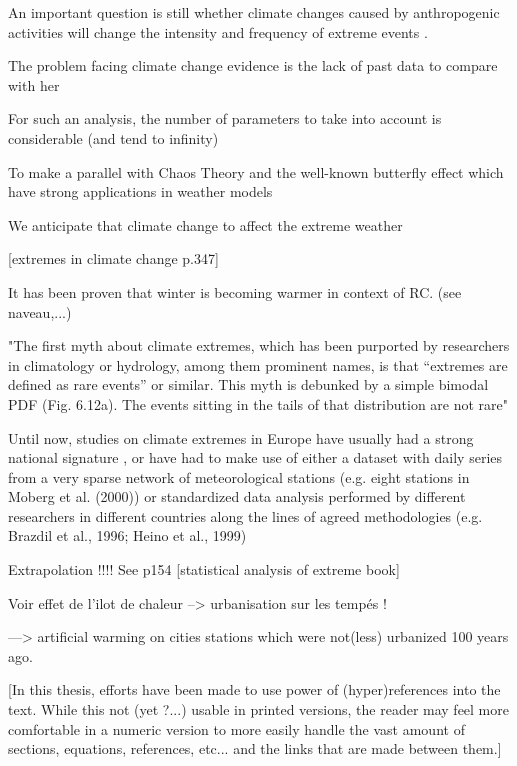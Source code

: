 \documentclass[11pt,a4paper,openany, twosided]{book}
\begin{document}
An important question is still whether climate changes caused by anthropogenic activities will change the intensity and frequency of extreme events \cite{milly_climate_2008}.

The problem facing climate change evidence is the lack of past data to compare with her

For such an analysis, the number of parameters to take into account is considerable (and tend to infinity)  

To make a parallel with Chaos Theory and the well-known butterfly effect which have strong applications in weather models\newline

We anticipate that climate change to affect the extreme weather  \newline

[extremes in climate change p.347]


It has been proven that winter is becoming warmer in context of RC. (see naveau,...)


\cite{kharin_changes_2006}


"The first myth about climate extremes, which has been purported by
researchers in climatology or hydrology, among them prominent names, is that
“extremes are defined as rare events” or similar. This myth is debunked by a simple
bimodal PDF (Fig. 6.12a). The events sitting in the tails of that distribution are not
rare" \cite[pp.257]{mudelsee_climate_2014}
\newline

Until now, studies on climate extremes in Europe have usually had a strong national signature
, or have had to make use of either a
dataset with daily series from a very sparse network of meteorological stations (e.g. eight stations in Moberg
et al. (2000)) or standardized data analysis performed by different researchers in different countries along the
lines of agreed methodologies (e.g. Brazdil et al., 1996; Heino et al., 1999) \cite{klein_tank_daily_2002}


Extrapolation !!!! See p154 [statistical analysis of extreme book]



Voir effet de l'ilot de chaleur --> urbanisation sur les tempés !

---> artificial warming on cities stations which were not(less) urbanized 100 years ago.

[In this thesis, efforts have been made to use power of (hyper)references into the 
text. While this not (yet ?...) usable in printed versions, the reader may feel more 
comfortable in a numeric version to more easily handle the vast amount of sections, 
equations, references, etc... and the links that are made between them.]
\end{document}
